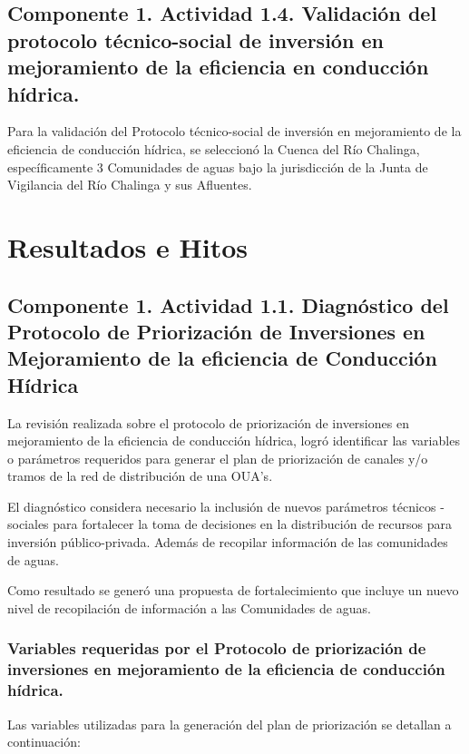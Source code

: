 \documentclass[]{article}
\begin{document}
\subsection{Componente 1. Actividad 1.4. Validación del protocolo técnico-social de inversión en mejoramiento de la eficiencia en conducción hídrica.}

Para la validación del Protocolo técnico-social de inversión en mejoramiento de la eficiencia de conducción hídrica, se seleccionó la Cuenca del Río Chalinga, específicamente 3 Comunidades de aguas bajo la jurisdicción de la Junta de Vigilancia del Río Chalinga y sus Afluentes. 

\clearpage
\section{Resultados e Hitos}

\subsection{Componente 1. Actividad 1.1. Diagnóstico del Protocolo de Priorización de Inversiones en Mejoramiento de la eficiencia de Conducción Hídrica}

La revisión realizada sobre el protocolo de priorización de inversiones en mejoramiento de la eficiencia de conducción hídrica, logró identificar las variables o parámetros requeridos para generar el plan de priorización de canales y/o tramos de la red de distribución de una OUA's. 

El diagnóstico considera necesario la inclusión de nuevos parámetros técnicos - sociales para fortalecer la toma de decisiones en la distribución de recursos para inversión público-privada. Además de recopilar información de las comunidades de aguas.

Como resultado se generó una propuesta de fortalecimiento que incluye un nuevo nivel de recopilación de información a las Comunidades de aguas.

\subsubsection{Variables requeridas por el Protocolo de priorización de inversiones en mejoramiento de la eficiencia de conducción hídrica.}

Las variables utilizadas para la generación del plan de priorización se detallan a continuación:
\end{document}
